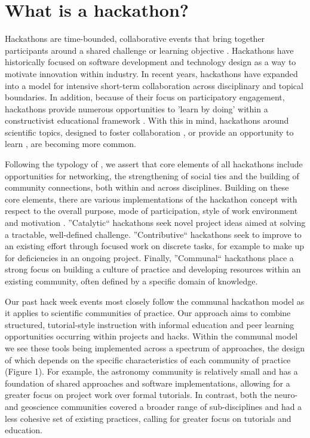 \section*{What is a hackathon?}

Hackathons are time-bounded, collaborative events that bring together participants around a shared challenge or learning objective \citep{Decker2015}.
Hackathons have historically focused on software development and technology design as a way to motivate innovation within industry.
In recent years, hackathons have expanded into a model for intensive short-term collaboration across disciplinary and topical boundaries.
In addition, because of their focus on participatory engagement, hackathons provide numerous opportunities to 'learn by doing' within a constructivist educational framework \citep{Bransford2000-lu,Papert1980-fh}.
With this in mind, hackathons around scientific topics, designed to foster collaboration \citep{Groen2015-cj,Moller2013-ah}, or provide an opportunity to learn \citep{Kienzler2015-zu,Lamers2014-xf}, are becoming more common.

Following the typology of \citep{Drouhard2017}, we assert that core elements of all hackathons include opportunities for networking, the strengthening of social ties and the building of community connections, both within and across disciplines.
Building on these core elements, there are various implementations of the hackathon concept with respect to the overall purpose, mode of participation, style of work environment and motivation \citep{Drouhard2017}.
''Catalytic`` hackathons seek novel project ideas aimed at solving a tractable, well-defined challenge.
''Contributive`` hackathons seek to improve to an existing effort through focused work on discrete tasks, for example to make up for deficiencies in an ongoing project.
Finally, ''Communal`` hackathons place a strong focus on building a culture of practice and developing resources within an existing community, often defined by a specific domain of knowledge.

Our past hack week events most closely follow the communal hackathon model as it applies to scientific communities of practice.
Our approach aims to combine structured, tutorial-style instruction with informal education and peer learning opportunities occurring within projects and hacks.
Within the communal model we see these tools being implemented across a spectrum of approaches, the design of which depends on the specific characteristics of each community of practice (Figure 1).
For example, the astronomy community is relatively small and has a foundation of shared approaches and software implementations, allowing for a greater focus on project work over formal tutorials.
In contrast, both the neuro- and geoscience communities covered a broader range of sub-disciplines and had a less cohesive set of existing practices, calling for greater focus on tutorials and education.

